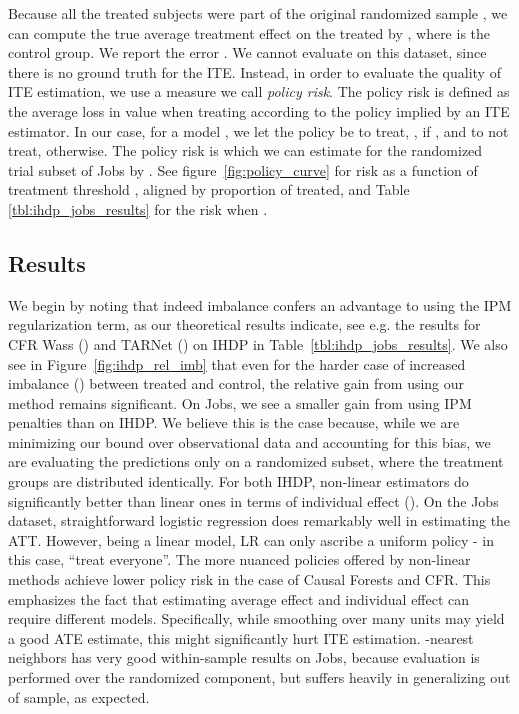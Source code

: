 \documentclass{article}
\def\tarnet{{TARNet}}
\begin{document}
Because all the treated subjects  were part of the original randomized sample , we can compute the true average treatment effect on the treated by , where  is the control group. We report the error .
We cannot evaluate  on this dataset, since there is no ground truth for the ITE. Instead, in order to evaluate the quality of ITE estimation, we use a measure we call \emph{policy risk}. The policy risk is defined as the average loss in value when treating according to the policy implied by an ITE estimator. In our case, for a model , we let the policy be to treat, , if , and to not treat,  otherwise. The policy risk is  which we can estimate for the randomized trial subset of Jobs by . See figure~\ref{fig:policy_curve} for risk as a function of treatment threshold , aligned by proportion of treated, and Table \ref{tbl:ihdp_jobs_results} for the risk when .
\vskip -5pt
\subsection{Results}
We begin by noting that indeed imbalance confers an advantage to using the IPM regularization term, as our theoretical results indicate, see e.g. the results for CFR Wass () and \tarnet{} () on IHDP in Table~\ref{tbl:ihdp_jobs_results}. We also see in Figure~\ref{fig:ihdp_rel_imb} that even for the harder case of increased imbalance () between treated and control, the relative gain from using our method remains significant. On Jobs, we see a smaller gain from using IPM penalties than on IHDP. We believe this is the case because, while we are minimizing our bound over observational data and accounting for this bias, we are evaluating the predictions only on a randomized subset, where the treatment groups are distributed identically.
For both IHDP, non-linear estimators do significantly better than linear ones in terms of individual effect (). On the Jobs dataset, straightforward logistic regression does remarkably well in estimating the ATT. However, being a linear model, LR can only ascribe a uniform policy - in this case, ``treat everyone''. The more nuanced policies offered by non-linear methods achieve lower policy risk in the case of Causal Forests and CFR. This emphasizes the fact that estimating average effect and individual effect can require different models. Specifically, while smoothing over many units may yield a good ATE estimate, this might significantly hurt ITE estimation. -nearest neighbors has very good within-sample results on Jobs, because evaluation is performed over the randomized component, but suffers heavily in generalizing out of sample, as expected.
\end{document}

